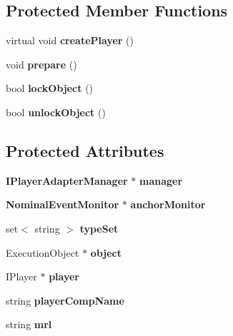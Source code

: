 \subsection*{Protected Member Functions}
\begin{CompactItemize}
\item 
virtual void \textbf{createPlayer} ()\label{classbr_1_1pucrio_1_1telemidia_1_1ginga_1_1ncl_1_1adapters_1_1FormatterPlayerAdapter_53b5e62f7f781843087c6539da035efb}

\item 
void \textbf{prepare} ()\label{classbr_1_1pucrio_1_1telemidia_1_1ginga_1_1ncl_1_1adapters_1_1FormatterPlayerAdapter_1825b40ca3bc3a1ba67fdb58fac5015c}

\item 
bool \textbf{lockObject} ()\label{classbr_1_1pucrio_1_1telemidia_1_1ginga_1_1ncl_1_1adapters_1_1FormatterPlayerAdapter_0955dd077c9caadb5c8cbd313631e349}

\item 
bool \textbf{unlockObject} ()\label{classbr_1_1pucrio_1_1telemidia_1_1ginga_1_1ncl_1_1adapters_1_1FormatterPlayerAdapter_b78a8966398f2c37b2ae06a532781f76}

\end{CompactItemize}
\subsection*{Protected Attributes}
\begin{CompactItemize}
\item 
{\bf IPlayerAdapterManager} $\ast$ {\bf manager}\label{classbr_1_1pucrio_1_1telemidia_1_1ginga_1_1ncl_1_1adapters_1_1FormatterPlayerAdapter_22ec8aea28dfad40b4ca5a7686e60aa4}

\item 
{\bf NominalEventMonitor} $\ast$ {\bf anchorMonitor}\label{classbr_1_1pucrio_1_1telemidia_1_1ginga_1_1ncl_1_1adapters_1_1FormatterPlayerAdapter_d8ba65755c08ee06087f849d8d01792b}

\item 
set$<$ string $>$ {\bf typeSet}\label{classbr_1_1pucrio_1_1telemidia_1_1ginga_1_1ncl_1_1adapters_1_1FormatterPlayerAdapter_145b3afaa194308141d367cc1393d565}

\item 
ExecutionObject $\ast$ {\bf object}\label{classbr_1_1pucrio_1_1telemidia_1_1ginga_1_1ncl_1_1adapters_1_1FormatterPlayerAdapter_738e042f7cf9f194ce1bcad50b1ab092}

\item 
IPlayer $\ast$ {\bf player}\label{classbr_1_1pucrio_1_1telemidia_1_1ginga_1_1ncl_1_1adapters_1_1FormatterPlayerAdapter_977a4dfa7c350d9028a3bb60be00e0c1}

\item 
string {\bf playerCompName}\label{classbr_1_1pucrio_1_1telemidia_1_1ginga_1_1ncl_1_1adapters_1_1FormatterPlayerAdapter_74a1250abff6a90dbd0c8b34e5ecc4f8}

\item 
string {\bf mrl}\label{classbr_1_1pucrio_1_1telemidia_1_1ginga_1_1ncl_1_1adapters_1_1FormatterPlayerAdapter_5d5d422ad7ac10d8e4b56138320f5703}

\end{CompactItemize}
